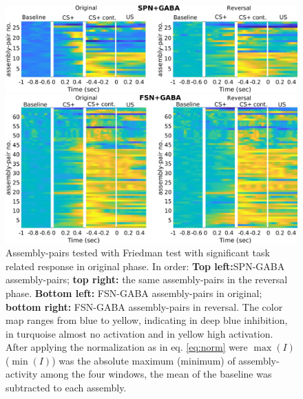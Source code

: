  \begin{figure}
     \centering
     \includegraphics[scale=0.32]{figures/HeatSPN_GABA.pdf}
     
     \vspace{1cm}
     
     \includegraphics[scale=0.32]{figures/HeatFSN_GABA.pdf}
     \caption{Assembly-pairs tested with Friedman test with significant task related response in original phase. In order: \textbf{Top left:}SPN-GABA assembly-pairs; \textbf{top right:} the same assembly-pairs in the reversal phase. \textbf{Bottom left:} FSN-GABA assembly-pairs in original; \textbf{bottom right:} FSN-GABA assembly-pairs in reversal. The color map ranges from blue to yellow, indicating in deep blue inhibition, in turquoise almost no activation and in yellow high activation. After applying the normalization as in eq. \ref{eq:norm} were $\max(I)$ ($\min(I)$) was the absolute maximum (minimum) of assembly-activity among the four windows, the mean of the baseline was subtracted to each assembly.}
     \label{fig:HeatPairsGaba}
 \end{figure}
